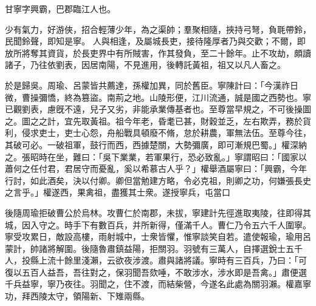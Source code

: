 \begin{pinyinscope}
 
 
 甘寧字興霸，巴郡臨江人也。
 
 
 少有氣力，好游俠，招合輕薄少年，為之渠帥；羣聚相隨，挾持弓弩，負毦帶鈴，民聞鈴聲，即知是寧。
 人與相逢，及屬城長吏，接待隆厚者乃與交歡；不爾，即放所將奪其資貨，於長吏界中有所賊害，作其發負，至二十餘年。止不攻劫，頗讀諸子，乃往依劉表，因居南陽，不見進用，後轉託黃祖，祖又以凡人畜之。
 
 
於是歸吳。周瑜、呂蒙皆共薦達，孫權加異，同於舊臣。寧陳計曰：「今漢祚日微，曹操彌憍，終為篡盜。南荊之地。山陵形便，江川流通，誠是國之西勢也。寧已觀劉表，慮旣不遠，兒子又劣，非能承業傳基者也。至尊當早規之，不可後操圖之。圖之之計，宜先取黃祖。祖今年老，昏耄已甚，財穀並乏，左右欺弄，務於貨利，侵求吏士，吏士心怨，舟船戰具頓廢不脩，怠於耕農，軍無法伍。至尊今往，其破可必。一破祖軍，鼓行而西，西據楚關，大勢彌廣，即可漸規巴蜀。」權深納之。張昭時在坐，難曰：「吳下業業，若軍果行，恐必致亂。」寧謂昭曰：「國家以蕭何之任付君，君居守而憂亂，奚以希慕古人乎？」權舉酒屬寧曰：「興霸，今年行討，如此酒矣，決以付卿。卿但當勉建方略，令必克祖，則卿之功，何嫌張長史之言乎。」權遂西，果禽祖，盡獲其士衆。遂授寧兵，屯當口
 
 
 
 
 後隨周瑜拒破曹公於烏林。攻曹仁於南郡，未拔，寧建計先徑進取夷陵，往即得其城，因入守之。時手下有數百兵，并所新得，僅滿千人。曹仁乃令五六千人圍寧。寧受攻累日，敵設高樓，雨射城中，士衆皆懼，惟寧談笑自若。遣使報瑜，瑜用呂蒙計，帥諸將解圍。後隨魯肅鎮益陽，拒關羽。羽號有三萬人，自擇選銳士五千人，投縣上流十餘里淺瀨，云欲夜涉渡。肅與諸將議。寧時有三百兵，乃曰：「可復以五百人益吾，吾往對之，保羽聞吾欬唾，不敢涉水，涉水即是吾禽。」肅便選千兵益寧，寧乃夜往。羽聞之，住不渡，而結柴營，今遂名此處為關羽瀨。權嘉寧功，拜西陵太守，領陽新、下雉兩縣。
 

\end{pinyinscope}
